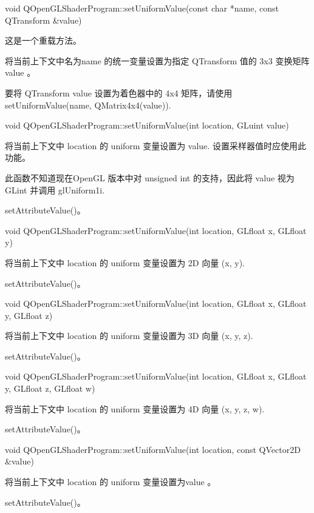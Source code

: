 void QOpenGLShaderProgram::setUniformValue(const char *name, const QTransform \&value)

这是一个重载方法。

将当前上下文中名为name 的统一变量设置为指定 QTransform 值的 3x3 变换矩阵 value 。

要将 QTransform value 设置为着色器中的 4x4 矩阵，请使用 setUniformValue(name, QMatrix4x4(value)).

void QOpenGLShaderProgram::setUniformValue(int location, GLuint value)

将当前上下文中 location 的 uniform 变量设置为 value. 设置采样器值时应使用此功能。


\begin{notice}
此函数不知道现在OpenGL 版本中对 unsigned int 的支持，因此将 value 视为 GLint 并调用 glUniform1i.
\end{notice}


\begin{seeAlso}
setAttributeValue()。
\end{seeAlso}

void QOpenGLShaderProgram::setUniformValue(int location, GLfloat x, GLfloat y)

将当前上下文中 location 的 uniform 变量设置为 2D 向量 (x, y).

\begin{seeAlso}
setAttributeValue()。
\end{seeAlso}

void QOpenGLShaderProgram::setUniformValue(int location, GLfloat x, GLfloat y, GLfloat z)

将当前上下文中 location 的 uniform 变量设置为 3D 向量 (x, y, z).


\begin{seeAlso}
setAttributeValue()。
\end{seeAlso}

void QOpenGLShaderProgram::setUniformValue(int location, GLfloat x, GLfloat y, GLfloat z, GLfloat w)

将当前上下文中 location 的 uniform 变量设置为 4D 向量 (x, y, z, w).

\begin{seeAlso}
setAttributeValue()。
\end{seeAlso}

void QOpenGLShaderProgram::setUniformValue(int location, const QVector2D \&value)

将当前上下文中 location 的 uniform 变量设置为value 。


\begin{seeAlso}
setAttributeValue()。
\end{seeAlso}

